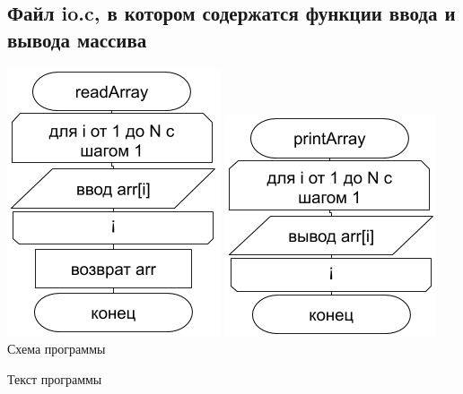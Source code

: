 \documentclass[a4paper,14pt]{extarticle}
\begin{document}
\subsection{Файл io.c, в котором содержатся функции ввода и вывода массива}
\begin{center}
\includegraphics[scale=0.6]{lab5-io-1.png}
\hspace{2cm}
\includegraphics[scale=0.6]{lab5-io-2.png}\\
Схема программы
\end{center}

\begin{center}
Текст программы\\
\end{center}
\end{document}
